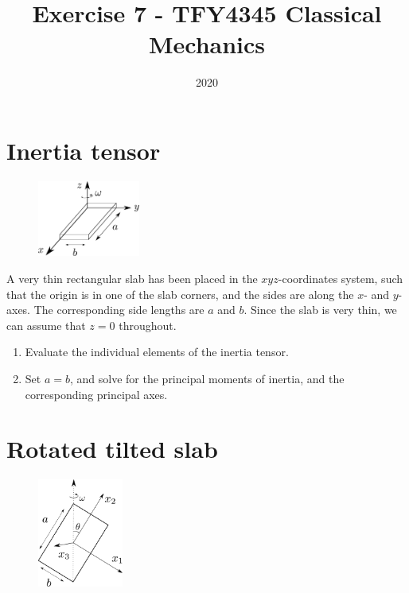 \documentclass{article}
\title{Exercise 7 - TFY4345 Classical Mechanics}
\date{2020}
\begin{document}
    \maketitle
    \section{Inertia tensor}
    \begin{figure}
        \includegraphics[width=0.3\textwidth]{figures/exercise_7_1_slab.pdf}
        \vspace{-2cm}
    \end{figure}
    A very thin rectangular slab has been placed in the $xyz$-coordinates system, such that the origin is in one of the slab corners, and the sides are along the $x$- and $y$-axes. The corresponding side lengths are $a$ and $b$. Since the slab is very thin, we can assume that $z=0$ throughout.
    \begin{enumerate}[label=(\alph*)]
        \item Evaluate the individual elements of the inertia tensor.
        \item Set $a = b$, and solve for the principal moments of inertia, and the corresponding principal axes.
    \end{enumerate}

    \section{Rotated tilted slab}
        \begin{figure}
            \includegraphics[width=0.25\textwidth]{figures/exercise_7_2_slab.pdf}
        \end{figure}
\end{document}

